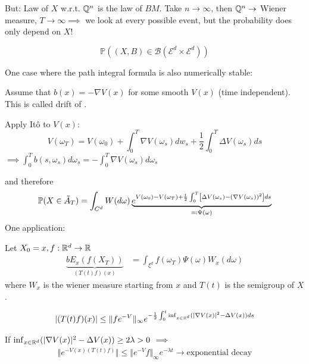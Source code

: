 But: Law of $X$ w.r.t. $\mathbb{Q}^n$ is the law of $BM$. Take $n\to\infty$, then $\mathbb{Q}^n\to$ Wiener measure,
$T\to\infty \implies$ we look at every possible event, but the probability does only depend on $X$!

\[\mathbb{P}((X,B)\in\mathcal{B}(\mathcal{E}^d\times\mathcal{E}^d))\]




One case where the path integral formula is also numerically stable:

Assume that $b(x)=-\nabla V(x)$ for some smooth $V(x)$ (time independent). This is called drift of .

Apply Itô to $V(x)$:
\[V(\omega_T)=V(\omega_0)+\int_0^T \nabla V(\omega_s)dw_s+\frac{1}{2}\int_0^T \Delta V(\omega_s)ds\]
$\implies \int_0^T b(s,\omega_s)d\omega_s=-\int_0^T\nabla V(\omega_s)d\omega_s$

and therefore 
\[\mathbb{P}(X\in\tilde{A}_T)=\int_{C^d}W(d\omega)\underbrace{e^{V(\omega_0)-V(\omega_T)+\frac{1}{2}\int_0^T\left[\Delta V(\omega_s)-(\nabla V(\omega_s))^2\right]ds}}_{\eqqcolon \Psi(\omega)}\]
One application: 

Let $X_0=x,f:\mathbb{R}^d\to\mathbb{R}$
\begin{align*}
    \underbrace{bE_x(f(X_T))}_{(T(t)f)(x)}&=\int_{\xi^d}f(\omega_T)\Psi(\omega)W_x(d\omega)
\end{align*}
where $W_x$ is the wiener measure starting from $x$ and $T(t)$ is the semigroup of $X$.

\begin{align*}
    |(T(t)f)(x)|\leq \Vert f e^{-V}\Vert_\infty e^{-\frac{1}{2}\int_0^t \inf_{x\in\mathbb{R}^d}(|\nabla V(x)|^2-\Delta V(x))ds}
\end{align*}

If $\inf_{x\in\mathbb{R}^d}(|\nabla V(x)|^2-\Delta V(x))\geq 2\lambda>0$ $\implies$
\begin{align*}
    \Vert e^{-V(x)(T(t)f)}\Vert\leq \Vert e^{-V}f\Vert_\infty e^{-\lambda t}\to\text{exponential decay}
\end{align*}




